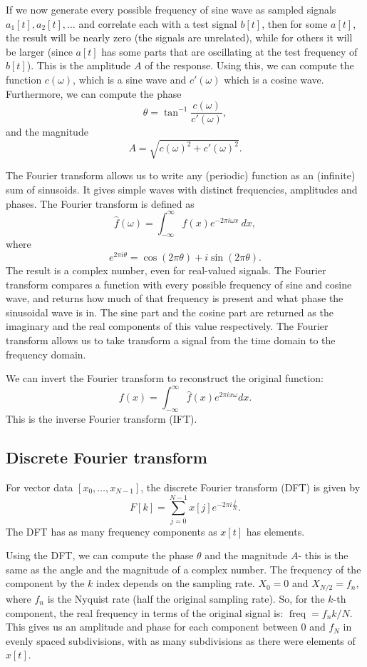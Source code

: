 \documentclass[a4paper, openany]{memoir}
\begin{document}
If we now generate every possible frequency of sine wave as sampled signals $a_1[t], a_2[t], \dots$ and correlate each with a test signal $b[t]$, then for some $a[t]$, the result will be nearly zero (the signals are unrelated), while for others it will be larger (since $a[t]$ has some parts that are oscillating at the test frequency of $b[t]$). This is the amplitude $A$ of the response. Using this, we can compute the function $c(\omega)$, which is a sine wave and $c'(\omega)$ which is a cosine wave. Furthermore, we can compute the phase
\[\theta = \tan^{-1} \frac{c(\omega)}{c'(\omega)},\]
and the magnitude
\[A = \sqrt{c(\omega)^2 + c'(\omega)^2}.\]

The Fourier transform allows us to write any (periodic) function as an (infinite) sum of sinusoids. It gives simple waves with distinct frequencies, amplitudes and phases. The Fourier transform is defined as
\[\hat{f}(\omega) = \int_{-\infty}^{\infty} f(x) e^{-2\pi i \omega x} \ dx,\]
where
\[e^{2\pi i \theta} = \cos (2\pi \theta) + i \sin (2\pi \theta).\]
The result is a complex number, even for real-valued signals. The Fourier transform compares a function with every possible frequency of sine and cosine wave, and returns how much of that frequency is present and what phase the sinusoidal wave is in. The sine part and the cosine part are returned as the imaginary and the real components of this value respectively. The Fourier transform allows us to take transform a signal from the time domain to the frequency domain.

We can invert the Fourier transform to reconstruct the original function:
\[f(x) = \int_{-\infty}^{\infty} \hat{f}(x) e^{2\pi i x \omega} dx.\]
This is the inverse Fourier transform (IFT).

\subsection{Discrete Fourier transform}
For vector data $[x_0, \dots, x_{N-1}]$, the discrete Fourier transform (DFT) is given by
\[F[k] = \sum_{j=0}^{N-1} x[j] e^{-2\pi i \frac{j}{N}}.\]
The DFT has as many frequency components as $x[t]$ has elements.

Using the DFT, we can compute the phase $\theta$ and the magnitude $A$- this is the same as the angle and the magnitude of a complex number. The frequency of the component by the $k$ index depends on the sampling rate. $X_0 = 0$ and $X_{N/2} = f_n$, where $f_n$ is the Nyquist rate (half the original sampling rate). So, for the $k$-th component, the real frequency in terms of the original signal is: $\operatorname{freq} = f_n k/N$. This gives us an amplitude and phase for each component between 0 and $f_N$ in evenly spaced subdivisions, with as many subdivisions as there were elements of $x[t]$.
\end{document}
